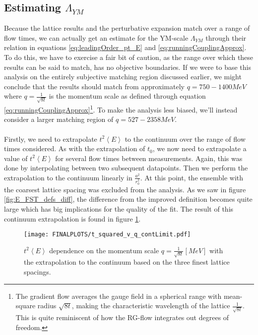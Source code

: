 \documentclass[a4paper,10pt]{book}
\begin{document}
\subsection{Estimating $\Lambda_{YM}$}
Because the lattice results and the perturbative expansion match over a range of flow times, we can actually get an estimate for the YM-scale $\Lambda_{YM}$ through their relation in equations \eqref{eq:leadingOrder_pt_E} and \eqref{eq:runningCouplingApprox}. To do this, we have to exercise a fair bit of caution, as the range over which these results can be said to match, has no objective boundaries. If we were to base this analysis on the entirely subjective matching region discussed earlier, we might conclude that the results should match from approximately $q = 750-1400MeV$ where $q=\frac{1}{\sqrt{8t}}$ is the momentum scale as defined through equation \eqref{eq:runningCouplingApprox}\footnote{The gradient flow averages the gauge field in a spherical range with mean-square radius $\sqrt{8t}$, making the characteristic wavelength of the lattice $\frac{1}{\sqrt{8t}}$. This is quite reminiscent of how the RG-flow integrates out degrees of freedom.}. To make the analysis less biased, we'll instead consider a larger matching region of $q = 527-2358MeV$.\\\\Firstly, we need to extrapolate $t^2\left\langle E\right\rangle $ to the continuum over the range of flow times considered. As with the extrapolation of $t_0$, we now need to extrapolate a value of $t^2\left\langle E\right\rangle $ for several flow times between measurements. Again, this was done by interpolating between two subsequent datapoints. Then we perform the extrapolation to the continuum linearly in $\frac{a^2}{r_0^2}$.  At this point, the ensemble with the coarsest lattice spacing was excluded from the analysis. As we saw in figure \ref{fig:E_FST_defs_diff}, the difference from the improved definition becomes quite large which has big implications for the quality of the fit. The result of this continuum extrapolation is found in figure \ref{fig:Coupling_cont_extrapolation}.
\begin{figure}[htbp]
\centering
\texttt{[image: FINALPLOTS/t\_squared\_v\_q\_contLimit.pdf]}
\caption[]{$t^2\left\langle E\right\rangle $ dependence on the momentum scale $q = \frac{1}{\sqrt{8t}}[MeV]$ with the extrapolation to the continuum based on the three finest lattice spacings.}\label{fig:Coupling_cont_extrapolation}
\end{figure}
\end{document}
